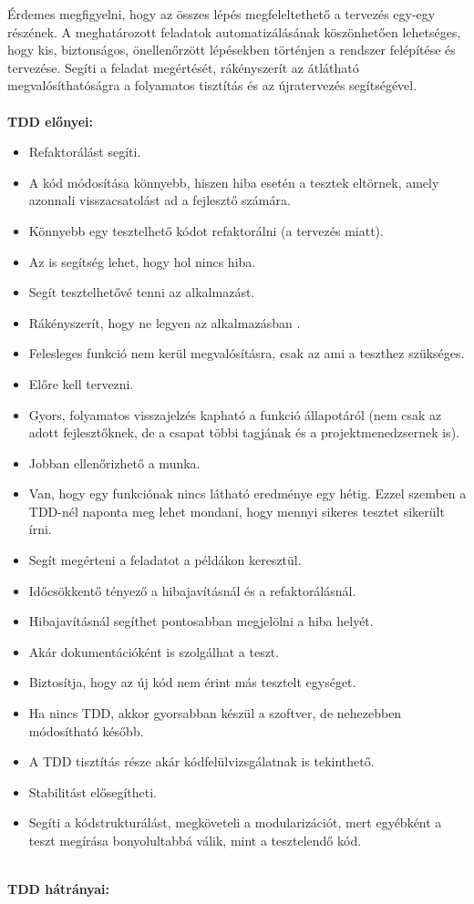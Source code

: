 Érdemes megfigyelni, hogy az összes lépés megfeleltethető a tervezés egy-egy részének. A meghatározott feladatok automatizálásának köszönhetően lehetséges, hogy kis, biztonságos, önellenőrzött lépésekben történjen a rendszer felépítése és tervezése. Segíti a feladat megértését, rákényszerít az átlátható megvalósíthatóságra a folyamatos tisztítás és az újratervezés segítségével.\\
\hfill\\
\textbf{TDD előnyei:}

\begin{itemize}
\item Refaktorálást segíti.
\item A kód módosítása könnyebb, hiszen hiba esetén a tesztek eltörnek, amely azonnali visszacsatolást ad a fejlesztő számára.
\item Könnyebb egy tesztelhető kódot refaktorálni (a tervezés miatt).
\item Az is segítség lehet, hogy hol nincs hiba.
\item Segít tesztelhetővé tenni az alkalmazást.
\item Rákényszerít, hogy ne legyen az alkalmazásban .
\item Felesleges funkció nem kerül megvalósításra, csak az ami a teszthez szükséges.
\item Előre kell tervezni.
\item Gyors, folyamatos visszajelzés kapható a funkció állapotáról (nem csak az adott fejlesztőknek, de a csapat többi tagjának és a projektmenedzsernek is).
\item Jobban ellenőrizhető a munka.
\item Van, hogy egy funkciónak nincs látható eredménye egy hétig. Ezzel szemben a TDD-nél naponta meg lehet mondani, hogy mennyi sikeres tesztet sikerült írni.
\item Segít megérteni a feladatot a példákon keresztül.
\item Időcsökkentő tényező a hibajavításnál és a refaktorálásnál.
\item Hibajavításnál segíthet pontosabban megjelölni a hiba helyét.
\item Akár dokumentációként is szolgálhat a teszt.
\item Biztosítja, hogy az új kód nem érint más tesztelt egységet.
\item Ha nincs TDD, akkor gyorsabban készül a szoftver, de nehezebben módosítható később.
\item A TDD tisztítás része akár kódfelülvizsgálatnak is tekinthető.
\item Stabilitást elősegítheti.
\item Segíti a kódstrukturálást, megköveteli a modularizációt, mert egyébként a teszt megírása bonyolultabbá válik, mint a tesztelendő kód.
\end{itemize}
\hfill\\
\textbf{TDD hátrányai:}

